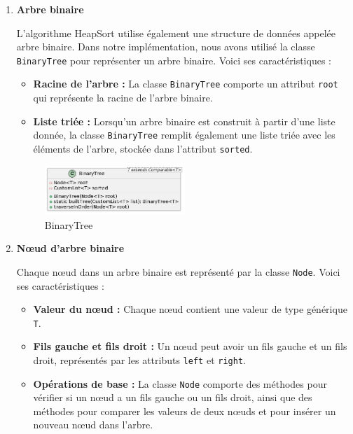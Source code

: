 \documentclass[a4paper,12pt]{article}
\begin{document}
\begin{enumerate}[label=\textbf{\arabic*.} , font=\bfseries]
\item \textbf{Arbre binaire}

L'algorithme HeapSort utilise également une structure de données appelée arbre binaire. Dans notre implémentation, nous avons utilisé la classe \texttt{BinaryTree} pour représenter un arbre binaire. Voici ses caractéristiques :

\begin{itemize}
    \item \textbf{Racine de l'arbre :} La classe \texttt{BinaryTree} comporte un attribut \texttt{root} qui représente la racine de l'arbre binaire.
    \item \textbf{Liste triée :} Lorsqu'un arbre binaire est construit à partir d'une liste donnée, la classe \texttt{BinaryTree} remplit également une liste triée avec les éléments de l'arbre, stockée dans l'attribut \texttt{sorted}.
\end{itemize}

\begin{figure}[H]
    \centering
    \includegraphics[width=0.5\textwidth]{BinaryTree.png}
    \caption{BinaryTree}
    \label{fig:BinaryTree}
\end{figure}

\item \textbf{Nœud d'arbre binaire}

Chaque nœud dans un arbre binaire est représenté par la classe \texttt{Node}. Voici ses caractéristiques :

\begin{itemize}
    \item \textbf{Valeur du nœud :} Chaque nœud contient une valeur de type générique \texttt{T}.
    \item \textbf{Fils gauche et fils droit :} Un nœud peut avoir un fils gauche et un fils droit, représentés par les attributs \texttt{left} et \texttt{right}.
    \item \textbf{Opérations de base :} La classe \texttt{Node} comporte des méthodes pour vérifier si un nœud a un fils gauche ou un fils droit, ainsi que des méthodes pour comparer les valeurs de deux nœuds et pour insérer un nouveau nœud dans l'arbre.
\end{itemize}


\end{enumerate}
\end{document}
